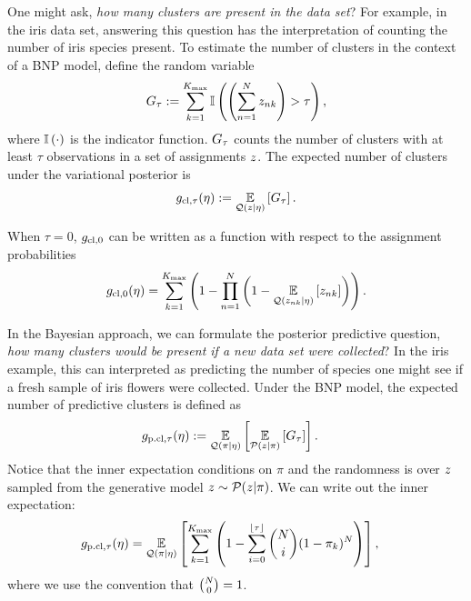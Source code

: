 \begin{ex}

One might ask, \textit{how many clusters are present in the data set}?
For example, in the iris data set, answering this question has the interpretation
of counting the number of iris species present.
To estimate the number of clusters in the context of a BNP model,
define the random variable
\begin{align*}
  G_\tau := \sum_{k=1}^{K_{\mathrm{max}}} \mathbb{I}\left( \left(\sum_{n=1}^{N}
  z_{nk}\right) > \tau\right),
\end{align*}
where $\mathbb{I}\left(\cdot\right)$ is the indicator function.
$G_\tau$ counts the number of clusters with at least $\tau$
observations in a set of assignments $z$.
The expected number of clusters under the variational posterior is
\begin{align*}
  g_{\text{cl},\tau}(\eta) := \underset{\mathcal{Q}(z\vert\eta)}{\mathbb{E}}\left[G_\tau\right].
\end{align*}

When $\tau = 0$, $g_{\text{cl},0}$ can be written as a function with respect to
the assignment probabilities
\begin{align*}
  g_{\text{cl},0}(\eta) = \sum_{k=1}^{K_{\mathrm{max}}} \left(1 -  \prod_{n=1}^N
  \left(1 - \underset{\mathcal{Q}(z_{nk}\vert\eta)}{\mathbb{E}}\left[z_{nk}\right]\right)\right).
\end{align*}
%
\end{ex}

\begin{ex}

In the Bayesian approach, we can formulate the posterior predictive question,
\textit{how many clusters would be present if a new data set were collected}?
In the iris example, this can interpreted as predicting the number of species
one might see if a fresh sample of iris flowers were collected.
Under the BNP model, the expected number of predictive clusters is defined as
\begin{align*}
  g_{\text{p.cl},\tau}(\eta) &:= \underset{\mathcal{Q}(\pi\vert\eta)}{\mathbb{E}}\left[\underset{\mathcal{P}(z\vert\pi)}{\mathbb{E}}\left[G_\tau\right]\right].
\end{align*}
Notice that the inner expectation conditions on $\pi$ and the randomness is
over $z$ sampled from the generative model $z\sim\mathcal{P}(z\vert\pi)$.
We can write out the inner expectation:
%
\begin{align*}
  g_{\text{p.cl},\tau}(\eta) &= \underset{\mathcal{Q}(\pi\vert\eta)}{\mathbb{E}}\left[\sum_{k=1}^{K_{\mathrm{max}}}\left(1 -
  \sum_{i=0}^{\lfloor\tau\rfloor} {N \choose i} (1 - \pi_k)^N \right)\right],
\end{align*}
where we use the convention that ${N\choose 0} = 1$.
%
\end{ex}

